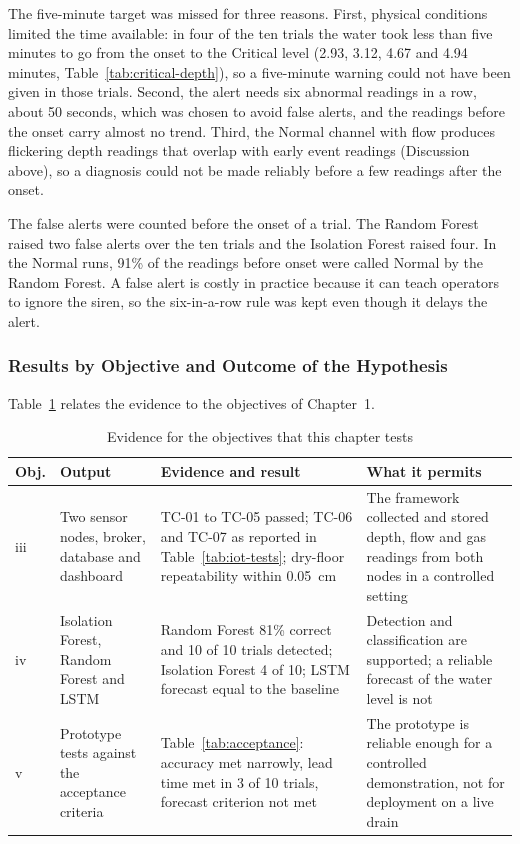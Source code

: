 \documentclass[12pt, a4paper]{article}
\begin{document}
The five-minute target was missed for three reasons. First, physical conditions limited the time available: in four of the ten trials the water took less than five minutes to go from the onset to the Critical level (2.93, 3.12, 4.67 and 4.94 minutes, Table~\ref{tab:critical-depth}), so a five-minute warning could not have been given in those trials. Second, the alert needs six abnormal readings in a row, about 50 seconds, which was chosen to avoid false alerts, and the readings before the onset carry almost no trend. Third, the Normal channel with flow produces flickering depth readings that overlap with early event readings (Discussion above), so a diagnosis could not be made reliably before a few readings after the onset.

The false alerts were counted before the onset of a trial. The Random Forest raised two false alerts over the ten trials and the Isolation Forest raised four. In the Normal runs, 91\% of the readings before onset were called Normal by the Random Forest. A false alert is costly in practice because it can teach operators to ignore the siren, so the six-in-a-row rule was kept even though it delays the alert.

\subsubsection{Results by Objective and Outcome of the Hypothesis}

Table~\ref{tab:by-objective} relates the evidence to the objectives of Chapter~1.

\begin{table}[H]
\centering
\begin{tabular}{|p{1.2cm}|p{3.4cm}|p{4.6cm}|p{4.8cm}|}
\hline
\textbf{Obj.} & \textbf{Output} & \textbf{Evidence and result} & \textbf{What it permits} \\
\hline
iii & Two sensor nodes, broker, database and dashboard & TC-01 to TC-05 passed; TC-06 and TC-07 as reported in Table~\ref{tab:iot-tests}; dry-floor repeatability within 0.05~cm & The framework collected and stored depth, flow and gas readings from both nodes in a controlled setting \\
\hline
iv & Isolation Forest, Random Forest and LSTM & Random Forest 81\% correct and 10 of 10 trials detected; Isolation Forest 4 of 10; LSTM forecast equal to the baseline & Detection and classification are supported; a reliable forecast of the water level is not \\
\hline
v & Prototype tests against the acceptance criteria & Table~\ref{tab:acceptance}: accuracy met narrowly, lead time met in 3 of 10 trials, forecast criterion not met & The prototype is reliable enough for a controlled demonstration, not for deployment on a live drain \\
\hline
\end{tabular}
\caption{Evidence for the objectives that this chapter tests}
\label{tab:by-objective}
\end{table}
\end{document}
